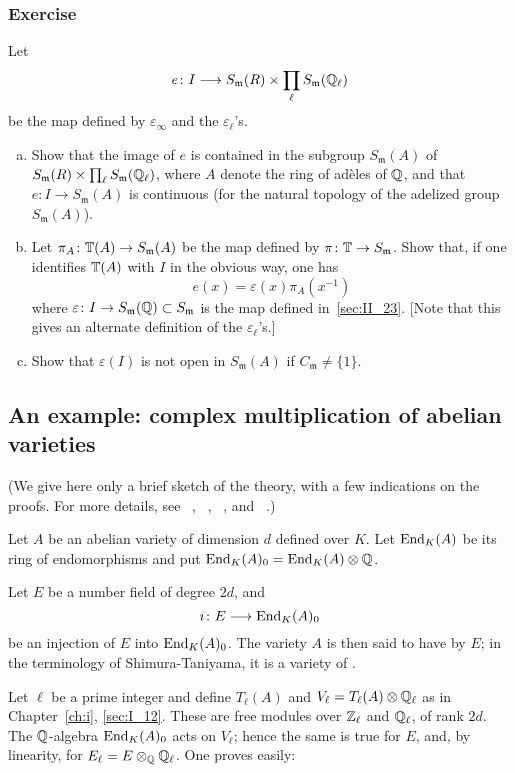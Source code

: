 \subsubsection*{Exercise}
Let 
\dpage
\[
	e \colon I \longrightarrow S_\mathfrak{m}(R) \times
	\prod_{\ell} S_\mathfrak{m}(\mathbb{Q}_\ell)
\]
be the map defined by $\varepsilon_\infty$ and the $\varepsilon_\ell$'s.
\begin{enumerate}[a)]
\item Show that the image of $e$ is contained in the subgroup
	$S_\mathfrak{m}(A)$ of $S_\mathfrak{m}(R) \times \prod_{\ell}
	S_\mathfrak{m}(\mathbb{Q}_\ell)$, where $A$ denote the ring of adèles of $\mathbb{Q}$,
	and that $e \colon I \to S_\mathfrak{m}(A)$ is continuous (for the
	natural topology of the adelized group $S_\mathfrak{m}(A)$).
\item Let $\pi_A \colon \mathbb{T}(A) \to S_\mathfrak{m}(A)$ be the map defined
	by $\pi \colon \mathbb{T} \to S_\mathfrak{m}$. Show that, if one
	identifies $\mathbb{T}(A)$ with $I$ in the obvious way, one has 
	\[
		e(x) = \varepsilon(x) \pi_A(x^{-1})
	\]
	where $\varepsilon \colon I \to S_\mathfrak{m}(\mathbb{Q}) \subset
	S_\mathfrak{m}$ is the map defined in~\ref{sec:II_23}. [Note that this
	gives an alternate definition of the $\varepsilon_\ell$'s.]
\item Show that $\varepsilon(I)$ is not open in $S_\mathfrak{m}(A)$ if
	$C_\mathfrak{m} \neq \{1\}$.
\end{enumerate}

\subsection{An example: complex multiplication of abelian varieties}
\label{sec:II_28}
(We give here only a brief sketch of the theory, with a few indications on the
proofs. For more details, see \citeauthor{34}~\cite{34},
\citeauthor{35}~\cite{35}, \citeauthor{41}~\cite{41}, \cite{42} and
\citeauthor{32}~\cite{32}.)

Let $A$ be an abelian variety of dimension $d$ defined over $K$.
Let $\operatorname{End}_K(A)$ be its ring of endomorphisms and put
$\operatorname{End}_K(A)_0 = \operatorname{End}_K(A) \otimes \mathbb{Q}$.

Let $E$ be a number field of degree $2d$, and
\dpage
\[
	i \colon E \longrightarrow \operatorname{End}_K(A)_0
\]
be an injection of $E$ into $\operatorname{End}_K(A)_0$. The variety $A$ is then said to
have  by $E$;
in the terminology of Shimura-Taniyama, it is a variety of .

Let $\ell$ be a prime integer and define $T_\ell(A)$ and $V_\ell = T_\ell(A)
\otimes \mathbb{Q}_\ell$ as in Chapter~\ref{ch:i}, \ref{sec:I_12}. These are free
modules over $\mathbb{Z}_\ell$ and $\mathbb{Q}_\ell$, of rank $2d$. The $\mathbb{Q}$-algebra
$\operatorname{End}_K(A)_0$ acts on $V_\ell$; hence the same is true for $E$, and, by
linearity, for $E_\ell = E \otimes_{\mathbb{Q}} \mathbb{Q}_\ell$. One proves easily:

